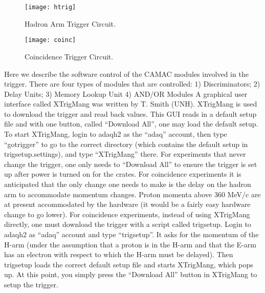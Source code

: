 \begin{figure}
\begin{center}
\texttt{[image: htrig]}
{\linespread{1.}
\caption[Data Acquisition: Hadron Arm Trigger]{Hadron Arm Trigger Circuit.}
\label{fig:htrig}}
\end{center}
\end{figure}

\begin{figure}
\begin{center}
\texttt{[image: coinc]}
{\linespread{1.}
\caption[Data Acquisition: Coincidence Trigger]{Coincidence Trigger Circuit.}
\label{fig:ctrig}}
\end{center}
\end{figure}

\par
Here we describe the software control
of the CAMAC modules involved in the trigger.
There are four types of modules that
are controlled:
\hskip 0.05in 
1) Discriminators;
\hskip 0.05in 
2) Delay Units;
\hskip 0.05in 
3) Memory Lookup Unit
\hskip 0.05in 
4) AND/OR Modules
\hskip 0.05in 
A graphical user interface called
XTrigMang was written by
T. Smith (UNH).  
XTrigMang is used to download
the trigger and read back values.
This GUI reads in a default setup file and
with one button, called ``Download All'',
one may load the default setup.
To start XTrigMang, login to adaqh2 as
the ``adaq'' account, then type ``gotrigger''
to go to the correct directory (which
contains the default setup in trigsetup.settings), 
and type ``XTrigMang'' there.
For experiments that never change
the trigger, one only needs to ``Download All''
to ensure the trigger is set up after
power is turned on for the crates.
For coincidence experiments it is anticipated
that the only change one needs to make is the
delay on the hadron arm to accommodate
momentum changes.  
Proton momenta above 360 MeV/c are at
present accommodated by the hardware (it would
be a fairly easy hardware change to go lower).
For coincidence experiments, instead
of using XTrigMang directly, one must download
the trigger with a script called trigsetup.
Login to adaqh2 as ``adaq'' account and
type ``trigsetup''.  It asks for the 
momentum of the H-arm (under the assumption
that a proton is in the H-arm and that the E-arm has
an electron with respect to which the H-arm must be
delayed).  Then trigsetup loads the
correct default setup file and starts
XTrigMang, which pops up.  At this point, 
you simply press
the ``Download All'' button in XTrigMang
to setup the trigger.  


